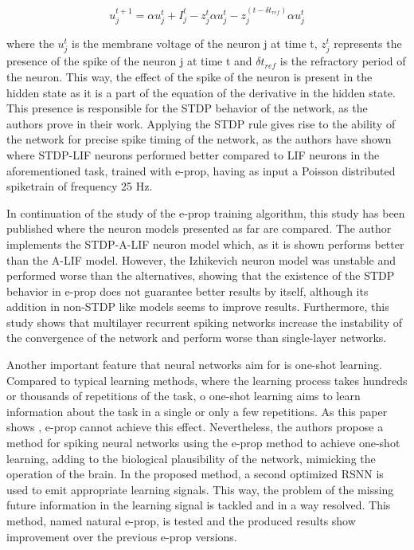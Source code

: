 \documentclass[12pt]{report}
\begin{document}
\begin{equation}
    u^{t+1}_j = \alpha u^t_j+I^t_j-z_j^t\alpha u^t_j-z_j^{(t-\delta t_{ref})}\alpha u^t_j
\end{equation}

where the \(u^t_j\) is the membrane voltage of the neuron j at time t, \(z_j^t\) represents the presence of the spike of the neuron j at time t and \(\delta t_{ref}\) is the refractory period of the neuron. This way, the effect of the spike of the neuron is present in the hidden state as it is a part of the equation of the derivative in the hidden state. This presence is responsible for the STDP behavior of the network, as the authors prove in their work. Applying the STDP rule gives rise to the ability of the network for precise spike timing of the network, as the authors have shown where STDP-LIF neurons performed better compared to LIF neurons in the aforementioned task, trained with e-prop, having as input a Poisson distributed spiketrain of frequency 25 Hz.

In continuation of the study of the e-prop training algorithm, this study has been published \cite{Veen2021} where the neuron models presented as far are compared. The author implements the STDP-A-LIF neuron model which, as it is shown performs better than the A-LIF model. However, the Izhikevich neuron model was unstable and performed worse than the alternatives, showing that the existence of the STDP behavior in e-prop does not guarantee better results by itself, although its addition in non-STDP like models seems to improve results. Furthermore, this study shows that multilayer recurrent spiking networks increase the instability of the convergence of the network and perform worse than single-layer networks.

Another important feature that neural networks aim for is one-shot learning. Compared to typical learning methods, where the learning process takes hundreds or thousands of repetitions of the task, o one-shot learning aims to learn information about the task in a single or only a few repetitions. As this paper shows \cite{Scherr2020}, e-prop cannot achieve this effect. Nevertheless, the authors propose a method for spiking neural networks using the e-prop method to achieve one-shot learning, adding to the biological plausibility of the network, mimicking the operation of the brain. In the proposed method, a second optimized RSNN is used to emit appropriate learning signals. This way, the problem of the missing future information in the learning signal is tackled and in a way resolved. This method, named natural e-prop, is tested and the produced results show improvement over the previous e-prop versions.
\end{document}
